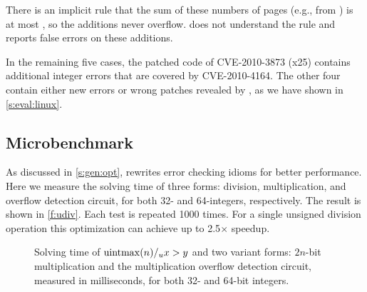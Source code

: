 There is an implicit rule that the sum of these numbers of pages
(e.g., from ) is at most , so the
additions never overflow.  \sys does not understand the rule and
reports false errors on these additions.

In the remaining five cases, the patched code of CVE-2010-3873 (x25)
contains additional integer errors that are covered by CVE-2010-4164.
The other four contain either new errors or wrong patches revealed
by \sys, as we have shown in \autoref{s:eval:linux}.

\subsection{Microbenchmark}
\label{s:eval:micro}

As discussed in \autoref{s:gen:opt}, \sys rewrites error checking
idioms for better performance.  Here we measure the solving time
of three forms: division, multiplication, and overflow detection
circuit, for both 32- and 64-integers, respectively.  The result
is shown in \autoref{f:udiv}.  Each test is repeated 1000 times.
For a single unsigned division operation this optimization can
achieve up to 2.5$\times$ speedup.

\begin{figure}
\centering

\caption{Solving time of $\operatorname{uintmax}(n) /_u x > y$ and two variant
forms: $2n$-bit multiplication and the multiplication overflow
detection circuit, measured in milliseconds, for both 32- and 64-bit
integers.}
\label{f:udiv}
\end{figure}
